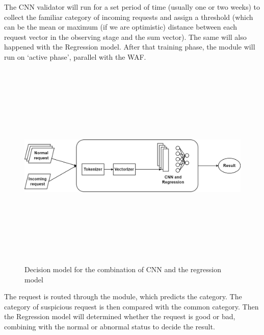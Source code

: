 The CNN validator will run for a set period of time (usually one or two weeks) to collect the familiar category of incoming requests and assign a threshold (which can be the mean or maximum (if we are optimistic) distance between each request vector in the observing stage and the sum vector). The same will also happened with the Regression model. After that training phase, the module will run on `active phase', parallel with the WAF. 

\begin{figure}[!h]
     \centering
     \includegraphics[width=\linewidth, height=10cm,keepaspectratio]{figures/decision model.png}
   \caption{Decision model for the combination of CNN and the regression model}
\end{figure}

The request is routed through the module, which predicts the category. The category of suspicious request is then compared with the common category. Then the Regression model will determined whether the request is good or bad, combining with the normal or abnormal status to decide the result. 
